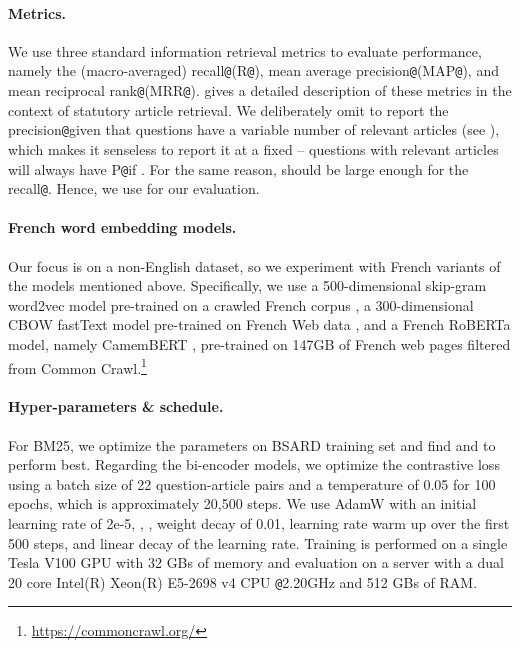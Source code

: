 \documentclass[11pt]{article}
\makeatletter
\newcommand{\at}{\texttt{@}}
\makeatother
\begin{document}
\paragraph{Metrics.}
We use three standard information retrieval metrics \citep{schutze2008introduction} to evaluate performance, namely the (macro-averaged) recall\at (R\at), mean average precision\at (MAP\at), and mean reciprocal rank\at (MRR\at).  gives a detailed description of these metrics in the context of statutory article retrieval. We deliberately omit to report the precision\at given that questions have a variable number of relevant articles (see ), which makes it senseless to report it at a fixed  -- questions with  relevant articles will always have P\at if . For the same reason,  should be large enough for the recall\at. Hence, we use  for our evaluation.


\paragraph{French word embedding models.}
Our focus is on a non-English dataset, so we experiment with French variants of the models mentioned above. Specifically, we use a 500-dimensional skip-gram word2vec model pre-trained on a crawled French corpus \citep{fauconnier2015french}, a 300-dimensional CBOW fastText model pre-trained on French Web data \citep{grave2018learning}, and a French RoBERTa model, namely CamemBERT \citep{martin2019camembert}, pre-trained on 147GB of French web pages filtered from Common Crawl.\footnote{\url{https://commoncrawl.org/}}


\paragraph{Hyper-parameters \& schedule.}
For BM25, we optimize the parameters on BSARD training set and find  and  to perform best. Regarding the bi-encoder models, we optimize the contrastive loss using a batch size of 22 question-article pairs and a temperature of 0.05 for 100 epochs, which is approximately 20,500 steps. We use AdamW \citep{loshchilov2019decoupled} with an initial learning rate of 2e-5, , , weight decay of 0.01, learning rate warm up over the first 500 steps, and linear decay of the learning rate. Training is performed on a single Tesla V100 GPU with 32 GBs of memory and evaluation on a server with a dual 20 core Intel(R) Xeon(R) E5-2698 v4 CPU \at 2.20GHz and 512 GBs of RAM.
\end{document}

